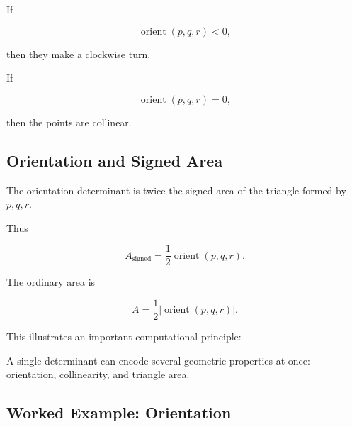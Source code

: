 If

\[
\boxed{
\operatorname{orient}(p,q,r)<0,
}
\]

then they make a clockwise turn.

If

\[
\boxed{
\operatorname{orient}(p,q,r)=0,
}
\]

then the points are collinear.

\begin{centereddiagram}
\end{centereddiagram}

\subsection{Orientation and Signed Area}
\label{subsec:orientation-signed-area}

The orientation determinant is twice the signed area of the triangle formed
by \(p,q,r\).

Thus

\[
\boxed{
A_{\text{signed}}
=
\frac12
\operatorname{orient}(p,q,r).
}
\]

The ordinary area is

\[
\boxed{
A
=
\frac12
\left|
\operatorname{orient}(p,q,r)
\right|.
}
\]

This illustrates an important computational principle:

\begin{conceptbox}
A single determinant can encode several geometric properties at once:
orientation, collinearity, and triangle area.
\end{conceptbox}

\subsection{Worked Example: Orientation}
\label{subsec:worked-orientation}

